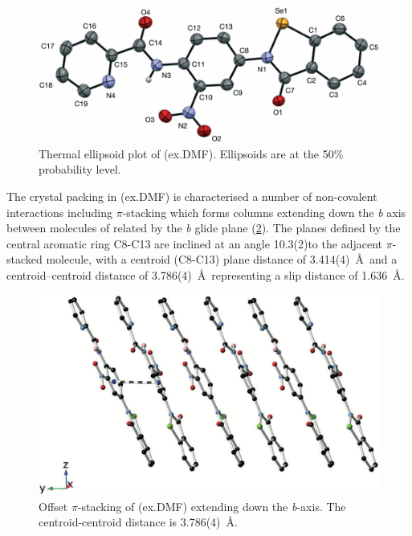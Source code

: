 \begin{refsection}
\begin{figure}
    \centering
    \includegraphics[width=0.8\linewidth]{Figures/ebs-nitroamide-2py-dmf-xtal.pdf}
    \caption{Thermal ellipsoid plot of (ex.DMF). Ellipsoids are at the 50\% probability level.}
    \label{fig:ebs-nitroamide-2py-dmf-xtal}
\end{figure}

The crystal packing in (ex.DMF) is characterised a number of non-covalent interactions including $\pi$-stacking which forms columns extending down the \emph{b} axis between molecules of  related by the \emph{b} glide plane (\cref{fig:ebs-nitroamide-2py-packing}).
The planes defined by the central aromatic ring C8-C13 are inclined at an angle 10.3(2)\degree to the adjacent $\pi$-stacked molecule, with a centroid (C8-C13) plane distance of 3.414(4)~\AA~and a centroid–centroid distance of 3.786(4)~\AA~representing a slip distance of 1.636~\AA.

\begin{figure}
    \centering
    \includegraphics[width=0.8\linewidth]{Figures/ebs-nitroamide-2py-packing.pdf}
    \caption{Offset $\pi$-stacking of (ex.DMF) extending down the \emph{b}-axis. The centroid-centroid distance is 3.786(4)~\AA.}
    \label{fig:ebs-nitroamide-2py-packing}
\end{figure}


\end{refsection}
